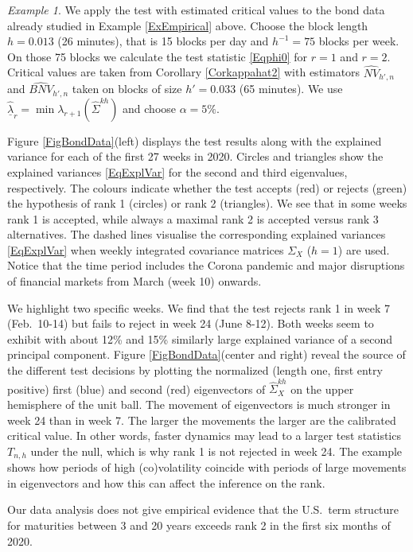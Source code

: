 \documentclass[preprint,aos]{imsart}
\numberwithin{equation}{section}
\theoremstyle{remark}
\newtheorem{example}[satz]{Example}
\begin{document}
\begin{example}\label{ExEmpirical2}
We apply the test with estimated critical values to the bond data already studied in Example \ref{ExEmpirical} above.
Choose the block length $h=0.013$ (26 minutes), that is 15 blocks per day and $h^{-1}=75$ blocks per week. On those 75 blocks we calculate the test statistic \eqref{Eqphi0} for $r=1$ and $r=2$. Critical values are taken from Corollary \ref{Corkappahat2} with estimators $\widehat{NV}_{h',n}$ and $\widehat{BNV}_{h',n}$ taken on blocks of size $h'=0.033$ (65 minutes). We use $\hat{\underline\lambda}_r=\min \lambda_{r+1}(\hat\Sigma^{kh})$ and choose $\alpha=5\%$.

Figure \ref{FigBondData}(left) displays the test results along with the explained variance  for each of the first 27 weeks in 2020.  Circles and triangles show the explained variances \eqref{EqExplVar} for the second and third eigenvalues, respectively. The colours indicate whether the test accepts (red) or rejects (green) the hypothesis of rank 1 (circles) or rank 2 (triangles). We see that in some weeks rank 1 is accepted, while always a maximal rank 2 is accepted versus rank 3 alternatives. The dashed lines visualise the corresponding explained variances \eqref{EqExplVar} when weekly integrated covariance matrices $\Sigma_X$ ($h=1$) are used. Notice that the time period includes the Corona pandemic and major disruptions of financial markets from March (week 10) onwards.

We highlight two specific weeks. We find that the test rejects rank 1 in week 7 (Feb.\ 10-14) but fails to reject in week 24 (June 8-12). Both weeks seem to exhibit with about 12\% and 15\% similarly large explained variance of a second principal component. Figure \ref{FigBondData}(center and right) reveal the source of the different test decisions by plotting the normalized (length one, first entry positive) first (blue) and second (red) eigenvectors of $\hat\Sigma_X^{kh}$ on the upper hemisphere of the unit ball. The movement of eigenvectors is much stronger in week 24 than in week 7. The larger the movements the larger are the calibrated critical value. In other words, faster dynamics may lead to a larger test statistics $T_{n,h}$ under the null, which is why rank 1 is not rejected in week 24. The example shows how periods of high (co)volatility coincide with periods of large movements in eigenvectors and how this can affect the inference on the rank.

Our data analysis does not give empirical evidence that the U.S.\ term structure for maturities between 3 and 20 years exceeds rank 2 in the first six months of 2020.
\end{example}
\end{document}
